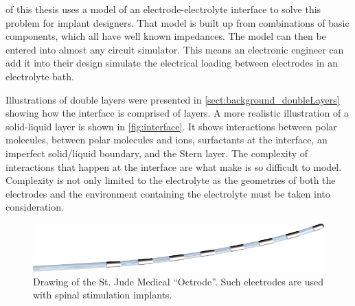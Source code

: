    of this thesis uses a model of an electrode-electrolyte interface to solve this problem for implant designers.
  That model is built up from combinations of basic components, which all have well known impedances.
  The model can then be entered into almost any circuit simulator.
  This means an electronic engineer can add it into their design simulate the electrical loading between electrodes in an electrolyte bath.

  Illustrations of double layers were presented in \cref{sect:background_doubleLayers} showing how the interface is comprised of layers.
  A more realistic illustration of a solid-liquid layer is shown in \cref{fig:interface}.
  It shows interactions between polar molecules, between polar molecules and ions, surfactants at the interface, an imperfect solid/liquid boundary, and the Stern layer.
  The complexity of interactions that happen at the interface are what make is so difficult to model.
  Complexity is not only limited to the electrolyte as the geometries of both the electrodes and the environment containing the electrolyte must be taken into consideration.

  \begin{figure}
    \begin{center}
      \includegraphics{content/introduction/graphics/StJudeOctrode}
    \end{center}
    \caption{Drawing of the St. Jude Medical ``Octrode''. Such electrodes are used with spinal stimulation implants.}
    \label{fig:octrode}
  \end{figure}

